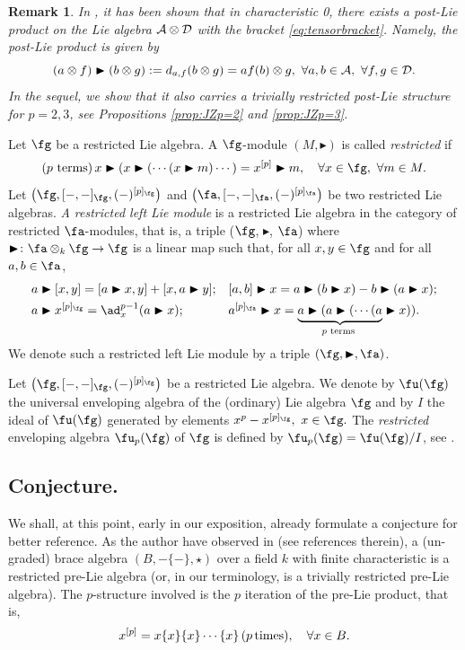 \documentclass[12pt]{article}
\newcommand {\A}{{\cal{A}}}
\newcommand{\D}{{\cal{D}}}
\newcommand{\btr}{\blacktriangleright}
\newtheorem{remark}[theorem]{Remark}
\begin{document}
\begin{remark} In \cite[Theorem 3.1]{JZ}, it has been shown that in characteristic 0, there exists a post-Lie product on the Lie algebra $\A\otimes\D$ with the bracket \eqref{eq:tensorbracket}. Namely, the post-Lie product is given by
\begin{equation}
    (a\otimes f)\btr(b\otimes g):=d_{a,f}(b\otimes g)=af(b)\otimes g,~\forall a,b\in \A,~\forall f,g\in \D.
\end{equation}
In the sequel, we show that it also carries a trivially restricted post-Lie structure for $p = 2,3$, see Propositions \ref{prop:JZp=2} and \ref{prop:JZp=3}.
\end{remark} 
Let $\fg$ be a restricted Lie algebra. A $\fg$-module $(M,\btr)$ is called \textit{restricted} if
\begin{equation}
(p \text{ terms})\,x\btr(x\btr(\cdots(x\btr m)\cdots) =x^{[p]}\btr m, \quad  \forall x\in \fg,~\forall  m\in M.
\end{equation}
Let $\left( \fg,[-,-]_\fg,(-)^{[p]_\fg}\right) $ and $\left( \fa,[-,-]_\fa,(-)^{[p]_\fa}\right) $ be two restricted Lie algebras. 
\emph{A restricted left Lie module} is a restricted Lie algebra in the category of restricted $\fa$-modules, that is, a triple ($\fg$, $\btr$, $\fa$) where $\btr \colon \fa \otimes_{k} \fg \to \fg$ is a linear map such that, for all $x,y\in \fg$ and for all $a,b\in\fa$,
\begin{align*}
    &a\btr[x,y]=[a\btr x,y]+[x,a\btr y];  && [a,b]\btr x=a\btr(b\btr x)-b\btr(a\btr x);\\
    &a\btr x^{[p]_\fg}=\ad_x^{p-1}(a \btr x);  &&a^{[p]_\fa}\btr x=\underset{p \text{ terms }}{\underbrace{a\btr(a\btr(\cdots(a}}\btr x)).
\end{align*} 
We denote such a restricted left Lie module by a triple $(\fg,\btr,\fa)$.


Let $\left( \fg,[-,-]_\fg,(-)^{[p]_\fg}\right) $ be a restricted Lie algebra. We denote by $\fu(\fg)$ the universal enveloping algebra of the (ordinary) Lie algebra $\fg$ and by $I$ the ideal of $\fu(\fg)$ generated by elements $x^p-x^{[p]_\fg},~x\in\fg.$ The \emph{restricted} enveloping algebra $\fu_p(\fg)$ of $\fg$ is defined by $\fu_p(\fg)=\fu(\fg)/I$, see \cite{J}.

\subsection{Conjecture.} We shall, at this point, early in our exposition, already formulate a conjecture for better reference. As the author have observed in \cite{Do} (see references therein),  a (un-graded) brace algebra $(B, -\{-\},\star)$ over a field $k$ with finite characteristic is a restricted pre-Lie algebra (or, in our terminology, is a trivially restricted pre-Lie algebra). The $p$-structure involved is the $p$ iteration of the pre-Lie product, that is, 
$$
x^{[p]} = x\{x\}\{x\}\cdots \{x\}\,({ p\,\rm times}),\quad \forall x\in B.
$$
\end{document}
